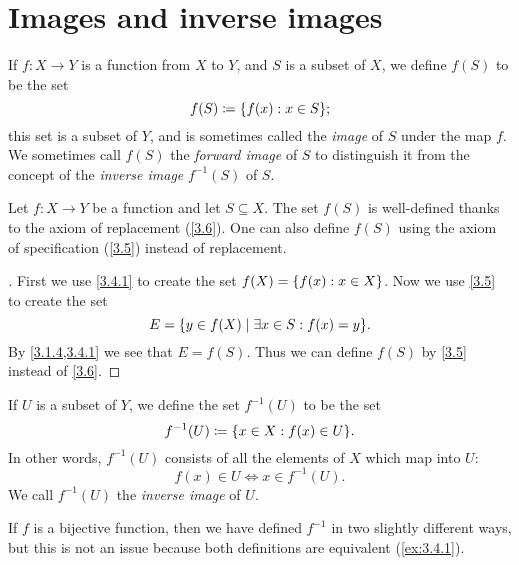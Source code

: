 \section{Images and inverse images}\label{sec:3.4}

\begin{defn}\label{3.4.1}
  If \(f : X \to Y\) is a function from \(X\) to \(Y\), and \(S\) is a subset of \(X\), we define \(f(S)\) to be the set
  \[
    f(S) \coloneqq \set{f(x) : x \in S};
  \]
  this set is a subset of \(Y\), and is sometimes called the \emph{image} of \(S\) under the map \(f\).
  We sometimes call \(f(S)\) the \emph{forward image} of \(S\) to distinguish it from the concept of the \emph{inverse image} \(f^{-1}(S)\) of \(S\).
\end{defn}

\begin{ac}\label{ac:3.4.1}
  Let \(f : X \to Y\) be a function and let \(S \subseteq X\).
  The set \(f(S)\) is well-defined thanks to the axiom of replacement (\cref{3.6}).
  One can also define \(f(S)\) using the axiom of specification (\cref{3.5}) instead of replacement.
\end{ac}

\begin{proof}[]
  First we use \cref{3.4.1} to create the set \(f(X) = \left\lbrace f(x) : x \in X\right\rbrace\).
  Now we use \cref{3.5} to create the set
  \[
    E = \set{y \in f(X) \mid \exists x \in S : f(x) = y}.
  \]
  By \cref{3.1.4,3.4.1} we see that \(E = f(S)\).
  Thus we can define \(f(S)\) by \cref{3.5} instead of \cref{3.6}.
\end{proof}

\setcounter{thm}{3}
\begin{defn}\label{3.4.4}
  If \(U\) is a subset of \(Y\), we define the set \(f^{-1}(U)\) to be the set
  \[
    f^{-1}(U) \coloneqq \set{x \in X : f(x) \in U}.
  \]
  In other words, \(f^{-1}(U)\) consists of all the elements of \(X\) which map into \(U\):
  \[
    f(x) \in U \iff x \in f^{-1}(U).
  \]
  We call \(f^{-1}(U)\) the \emph{inverse image} of \(U\).
\end{defn}

\setcounter{thm}{6}
\begin{rmk}\label{3.4.6}
  If \(f\) is a bijective function, then we have defined \(f^{-1}\) in two slightly different ways, but this is not an issue because both definitions are equivalent (\cref{ex:3.4.1}).
\end{rmk}

